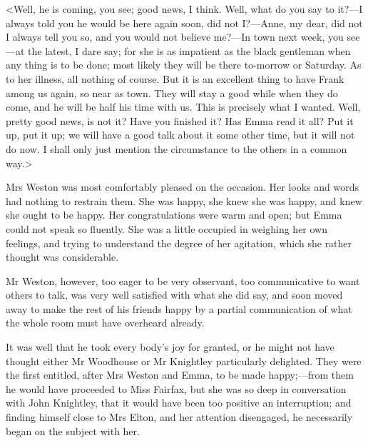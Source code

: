 <Well, he is coming, you see; good news, I think. Well, what do you say to it?—I always told you he would be here again soon, did not I\@?—Anne, my dear, did not I always tell you so, and you would not believe me?—In town next week, you see—at the latest, I dare say; for she is as impatient as the black gentleman when any thing is to be done; most likely they will be there to-morrow or Saturday. As to her illness, all nothing of course. But it is an excellent thing to have Frank among us again, so near as town. They will stay a good while when they do come, and he will be half his time with us. This is precisely what I wanted. Well, pretty good news, is not it? Have you finished it? Has Emma read it all? Put it up, put it up; we will have a good talk about it some other time, but it will not do now. I shall only just mention the circumstance to the others in a common way.>

Mrs Weston was most comfortably pleased on the occasion. Her looks and words had nothing to restrain them. She was happy, she knew she was happy, and knew she ought to be happy. Her congratulations were warm and open; but Emma could not speak so fluently. She was a little occupied in weighing her own feelings, and trying to understand the degree of her agitation, which she rather thought was considerable.

Mr Weston, however, too eager to be very observant, too communicative to want others to talk, was very well satisfied with what she did say, and soon moved away to make the rest of his friends happy by a partial communication of what the whole room must have overheard already.

It was well that he took every body's joy for granted, or he might not have thought either Mr Woodhouse or Mr Knightley particularly delighted. They were the first entitled, after Mrs Weston and Emma, to be made happy;—from them he would have proceeded to Miss Fairfax, but she was so deep in conversation with John Knightley, that it would have been too positive an interruption; and finding himself close to Mrs Elton, and her attention disengaged, he necessarily began on the subject with her.